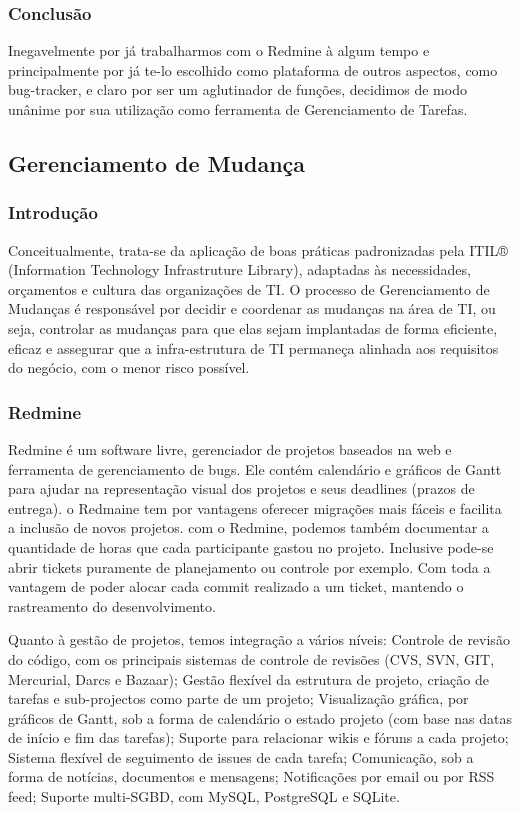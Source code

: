 \documentclass[12pt,a4paper]{article}
\begin{document}
		
		\subsubsection{Conclusão}
		
			Inegavelmente por já trabalharmos com o Redmine à algum tempo e principalmente por já te-lo escolhido como plataforma de outros aspectos, como bug-tracker, e claro por ser um aglutinador de funções, decidimos de modo unânime por sua utilização como ferramenta de Gerenciamento de Tarefas. 
		
		
	\clearpage	
	\subsection{Gerenciamento de Mudança}
	
		\subsubsection{Introdução}
		
			Conceitualmente, trata-se da aplicação de boas práticas padronizadas pela ITIL® (Information Technology Infrastruture Library), adaptadas às necessidades, orçamentos e cultura das organizações de TI. O processo de Gerenciamento de Mudanças é responsável por decidir e coordenar as mudanças na área de TI, ou seja, controlar as mudanças para que elas sejam implantadas de forma eficiente, eficaz e assegurar que a infra-estrutura de TI permaneça alinhada aos requisitos do negócio, com o menor risco possível.
		
		\subsubsection{Redmine}
		
			Redmine é um software livre, gerenciador de projetos baseados na web e ferramenta de gerenciamento de bugs. Ele contém calendário e gráficos de Gantt para ajudar na representação visual dos projetos e seus deadlines (prazos de entrega).  o Redmaine tem por vantagens oferecer migrações mais fáceis e facilita a inclusão de novos projetos. com o Redmine, podemos também documentar a quantidade de horas que cada participante gastou no projeto. Inclusive pode-se abrir tickets puramente de planejamento ou controle por exemplo. Com toda a vantagem de poder alocar cada commit realizado a um ticket, mantendo o rastreamento do desenvolvimento.
			
			Quanto à gestão de projetos, temos integração a vários níveis: Controle de revisão do código, com  os principais sistemas de controle de revisões (CVS, SVN, GIT, Mercurial, Darcs e Bazaar); Gestão flexível da estrutura de projeto, criação de tarefas e sub-projectos como parte de um projeto;
			Visualização gráfica, por gráficos de Gantt, sob a forma de calendário o estado projeto (com base nas datas de início e fim das tarefas); Suporte para relacionar wikis e fóruns a cada projeto; Sistema flexível de seguimento de issues de cada tarefa; Comunicação, sob a forma de notícias, documentos e mensagens; Notificações por email ou por RSS feed; Suporte multi-SGBD, com MySQL, PostgreSQL e SQLite.
			
\end{document}
